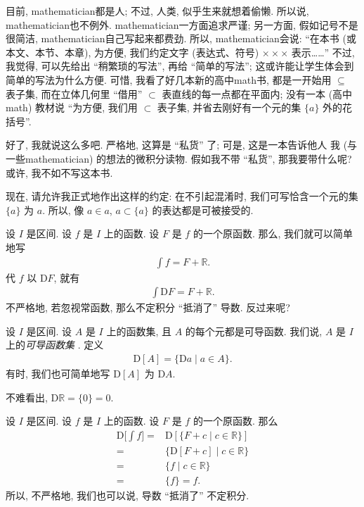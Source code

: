 目前, \gls{mathematician}都是人;
不过, 人类, 似乎生来就想着偷懒.
所以说, \gls{mathematician}也不例外.
\gls{mathematician}一方面追求严谨;
另一方面, 假如记号不是很简洁,
\gls{mathematician}自己写起来都费劲.
所以, \gls{mathematician}会说:
``在本书 (或本文、本节、本章), 为方便,
我们约定文字 (表达式、符号) $\times \times \times$ 表示……''
不过, 我觉得, 可以先给出 ``稍繁琐的写法'',
再给 ``简单的写法'';
这或许能让学生体会到简单的写法为什么方便.
可惜, 我看了好几本新的高中\gls{math}书,
都是一开始用 $\subseteq$ 表子集,
而在立体几何里 ``借用'' $\subset$ 表直线的每一点都在平面内;
没有一本 (高中\gls{math}) 教材说
``为方便, 我们用 $\subset$ 表子集,
并省去刚好有一个元的集 $\{ a \}$ 外的花括号''.

好了, 我就说这么多吧.
严格地, 这算是 ``私货'' 了;
可是, 这是一本告诉他人%
我 (与一些\gls{mathematician}) 的想法的微积分读物.
假如我不带 ``私货'', 那我要带什么呢?
或许, 我不如不写这本书.

现在, 请允许我正式地作出这样的约定:
在不引起混淆时, 我们可写恰含一个元的集 $\{ a \}$ 为 $a$.
所以, 像 $a \in a$, $a \subset \{ a \}$ 的表达都是可被接受的.

设 $I$ 是区间.
设 $f$ 是 $I$ 上的函数.
设 $F$ 是 $f$ 的一个原函数.
那么, 我们就可以简单地写
\begin{align*}
    \int {f} = F + \mathbb{R}.
\end{align*}
代 $f$ 以 $\mathrm{D}F$, 就有
\begin{align*}
    \int {\mathrm{D}F} = F + \mathbb{R}.
\end{align*}
不严格地, 若忽视常函数, 那么不定积分 ``抵消了'' 导数.
反过来呢?

\begin{definition}
    设 $I$ 是区间.
    设 $A$ 是 $I$ 上的函数集, 且 $A$ 的每个元都是可导函数.
    我们说, $A$ 是 $I$ 上的\emph{可导函数集}%
    .
    定义
    \begin{align*}
        \mathrm{D} [A] = \{ \mathrm{D}a \mid a \in A \}.
    \end{align*}
    有时, 我们也可简单地写 $\mathrm{D}[A]$ 为 $\mathrm{D}A$.
\end{definition}

\begin{example}
    不难看出, $\mathrm{D} \mathbb{R} = \{ 0 \} = 0$.
\end{example}

设 $I$ 是区间.
设 $f$ 是 $I$ 上的函数.
设 $F$ 是 $f$ 的一个原函数.
那么
\begin{align*}
    \mathrm{D} \Bigg[ \int {f} \Bigg]
    = {} & \mathrm{D} [\{ F + c \mid \text{$c \in \mathbb{R}$} \}] \\
    = {} & \{ \mathrm{D}[F + c] \mid \text{$c \in \mathbb{R}$} \}  \\
    = {} & \{ f \mid \text{$c \in \mathbb{R}$} \}                  \\
    = {} & \{ f \}  = f.
\end{align*}
所以, 不严格地, 我们也可以说, 导数 ``抵消了'' 不定积分.

